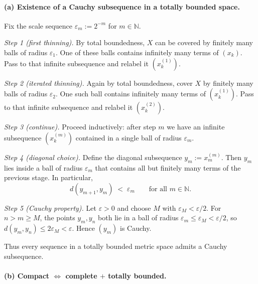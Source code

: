 \documentclass[12pt,a4paper]{article}
\theoremstyle{plain}
\theoremstyle{definition}
\theoremstyle{remark}
\theoremstyle{remark}
\begin{document}
\bigskip

\paragraph{(a) Existence of a Cauchy subsequence in a totally bounded space.}
Fix the scale sequence $\varepsilon_m := 2^{-m}$ for $m\in\mathbb{N}$.

\medskip

\emph{Step 1 (first thinning).} By total boundedness, $X$ can be covered by finitely many balls of radius $\varepsilon_1$.
One of these balls contains infinitely many terms of $(x_k)$. Pass to that infinite subsequence and relabel it $(x^{(1)}_k)$.

\medskip

\emph{Step 2 (iterated thinning).} Again by total boundedness, cover $X$ by finitely many balls of radius $\varepsilon_2$.
One such ball contains infinitely many terms of $(x^{(1)}_k)$. Pass to that infinite subsequence and relabel it $(x^{(2)}_k)$.

\medskip

\emph{Step 3 (continue).} Proceed inductively: after step $m$ we have an infinite subsequence
$(x^{(m)}_k)$ contained in a single ball of radius $\varepsilon_m$.

\medskip

\emph{Step 4 (diagonal choice).} Define the diagonal subsequence $y_m := x^{(m)}_m$.
Then $y_m$ lies inside a ball of radius $\varepsilon_m$ that contains all but finitely many terms of the previous stage.
In particular,
\[
d(y_{m+1},y_m) \;<\; \varepsilon_m \qquad \text{for all } m\in\mathbb{N}.
\]

\medskip

\emph{Step 5 (Cauchy property).} Let $\varepsilon>0$ and choose $M$ with $\varepsilon_M<\varepsilon/2$.
For $n>m\ge M$, the points $y_m,y_n$ both lie in a ball of radius $\varepsilon_m\le \varepsilon_M<\varepsilon/2$,
so $d(y_m,y_n)\le 2\varepsilon_M<\varepsilon$. Hence $(y_m)$ is Cauchy.

\medskip

Thus every sequence in a totally bounded metric space admits a Cauchy subsequence.

\bigskip

\paragraph{(b) Compact $\Longleftrightarrow$ complete $+$ totally bounded.}
\end{document}
